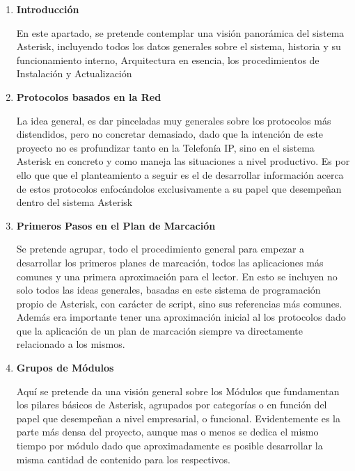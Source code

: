 \begin{enumerate}

\setlength{\itemsep}{10pt}

	\item \textbf{Introducción} 
	
	En este apartado, se pretende contemplar una visión panorámica del sistema Asterisk, incluyendo todos los datos generales sobre el sistema, historia y su funcionamiento interno, Arquitectura en esencia, los procedimientos de Instalación y Actualización 
		
	\item \textbf{Protocolos basados en la Red} 
	
	La idea general, es dar pinceladas muy generales sobre los protocolos más distendidos, pero no concretar demasiado, dado que la intención de este proyecto no es profundizar tanto en la Telefonía IP, sino en el sistema Asterisk en concreto y como maneja las situaciones a nivel productivo. Es por ello que que el planteamiento a seguir es el de desarrollar información acerca de estos protocolos enfocándolos exclusivamente a su papel que desempeñan dentro del sistema Asterisk
	
	\item \textbf{Primeros Pasos en el Plan de Marcación} 
	
	Se pretende agrupar, todo el procedimiento general para empezar a desarrollar los primeros planes de marcación, todos las aplicaciones más comunes y una primera aproximación para el lector. En esto se incluyen no solo todos las ideas generales, basadas en este sistema de programación propio de Asterisk, con carácter de script, sino sus referencias más comunes. Además era importante tener una aproximación inicial al los protocolos dado que la aplicación de un plan de marcación siempre va directamente relacionado a los mismos.
	
	\item \textbf{Grupos de Módulos} 
		
	Aquí se pretende da una visión general sobre los Módulos que fundamentan los pilares básicos de Asterisk, agrupados por categorías o en función del papel que desempeñan a nivel empresarial, o funcional. Evidentemente es la parte más densa del proyecto, aunque mas o menos se dedica el mismo tiempo por módulo dado que aproximadamente es posible desarrollar la misma cantidad de contenido para los respectivos.\\
	
	\begin{itemize}
	 

\end{itemize}
\end{enumerate}
